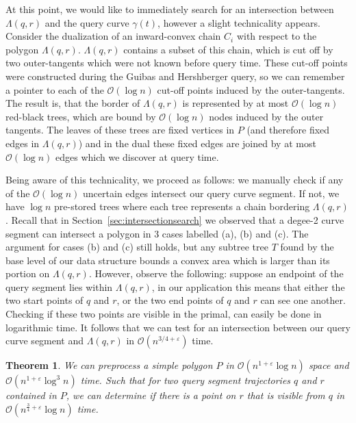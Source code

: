 \documentclass[a4paper, UKenglish]{paper}
\newtheorem{theorem}{Theorem}
\begin{document}
At this point, we would like to immediately search for an intersection between $\Lambda(q,r)$ and the query curve $\gamma(t)$, however a slight technicality appears. Consider the dualization of an inward-convex chain $C_i$ with respect to the polygon $\Lambda(q,r)$. $\Lambda(q,r)$ contains a subset of this chain, which is cut off by two outer-tangents which were not known before query time. These cut-off points were constructed during the Guibas and Hershberger query, so we can remember a pointer to each of the $\mathcal{O}(\log n)$ cut-off points induced by the outer-tangents. The result is, that the border of $\Lambda(q,r)$ is represented by at most $\mathcal{O}(\log n)$ red-black trees, which are bound by $\mathcal{O}(\log n)$ nodes induced by the outer tangents. The leaves of these trees are fixed vertices in $P$ (and therefore fixed edges in $\Lambda(q,r)$) and in the dual these fixed edges are joined by at most $\mathcal{O}(\log n)$ edges which we discover at query time.

Being aware of this technicality, we proceed as follows: we manually check if any of the $\mathcal{O}(\log n)$ uncertain edges intersect our query curve segment. If not, we have $\log n$ pre-stored trees where each tree represents a chain bordering $\Lambda(q,r)$. Recall that in Section~\ref{sec:intersectionsearch} we observed that a degee-2 curve segment can intersect a polygon in 3 cases labelled (a), (b) and (c). The argument for cases (b) and (c) still holds, but any subtree tree $T$ found by the base level of our data structure bounds a convex area which is larger than its portion on $\Lambda(q,r)$. However, observe the following: suppose an endpoint of the query segment lies within $\Lambda(q,r)$, in our application this means that either the two start points of $q$ and $r$, or the two end points of $q$ and $r$ can see one another. Checking if these two points are visible in the primal, can easily be done in logarithmic time. It follows that we can test for an intersection between our query curve segment and $\Lambda(q,r)$ in $\mathcal{O}(n^{3/4 + \varepsilon})$ time.

\begin{theorem}
    We can preprocess a simple polygon $P$ in $\mathcal{O}(n^{1 + \varepsilon} \log n )$ space and $\mathcal{O}(n^{1 + \varepsilon} \log^3 n)$ time. Such that for two query segment trajectories $q$ and $r$ contained in $P$, we can determine if there is a point on $r$ that is visible from $q$ in $\mathcal{O}(n^{\frac{3}{4} + \varepsilon} \log n)$ time.
\end{theorem}
\end{document}
